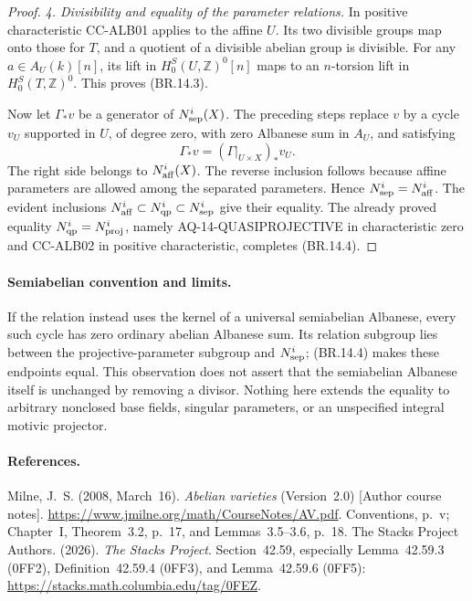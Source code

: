 \begin{proof}
\emph{4. Divisibility and equality of the parameter relations.}
In positive characteristic CC-ALB01 applies to the affine
\(U\).  Its two divisible groups map onto those for \(T\),
and a quotient of a divisible abelian group is divisible.
For any \(a\in A_U(k)[n]\), its lift in
\(H^S_0(U,\mathbb Z)^0[n]\) maps to an \(n\)-torsion lift
in \(H^S_0(T,\mathbb Z)^0\).  This proves (BR.14.3).

Now let \(\Gamma_*v\) be a generator of
\(N^i_{\rm sep}(X)\).  The preceding steps replace \(v\)
by a cycle \(v_U\) supported in \(U\), of degree zero,
with zero Albanese sum in \(A_U\), and satisfying
\[
        \Gamma_*v=(\Gamma|_{U\times X})_*v_U.
                                                               \tag{BR.14.7}
\]
The right side belongs to \(N^i_{\rm aff}(X)\).  The reverse
inclusion follows because affine parameters are allowed among
the separated parameters.  Hence
\(N^i_{\rm sep}=N^i_{\rm aff}\).  The evident inclusions
\(N^i_{\rm aff}\subset N^i_{\rm qp}\subset N^i_{\rm sep}\)
give their equality.  The already proved equality
\(N^i_{\rm qp}=N^i_{\rm proj}\), namely
AQ-14-QUASIPROJECTIVE in characteristic zero and CC-ALB02
in positive characteristic, completes (BR.14.4).
\end{proof}

\paragraph{Semiabelian convention and limits.}
If the relation instead uses the kernel of a universal
semiabelian Albanese, every such cycle has zero ordinary
abelian Albanese sum.  Its relation subgroup lies between
the projective-parameter subgroup and \(N^i_{\rm sep}\);
(BR.14.4) makes these endpoints equal.  This observation
does not assert that the semiabelian Albanese itself is
unchanged by removing a divisor.  Nothing here extends
the equality to arbitrary nonclosed base fields, singular
parameters, or an unspecified integral motivic projector.

\paragraph{References.}
Milne, J.~S. (2008, March~16). \emph{Abelian varieties}
(Version~2.0) [Author course notes].
\url{https://www.jmilne.org/math/CourseNotes/AV.pdf}.
Conventions, p.~v; Chapter~I, Theorem~3.2, p.~17,
and Lemmas~3.5--3.6, p.~18.
The Stacks Project Authors. (2026). \emph{The Stacks Project}.
Section~42.59, especially Lemma~42.59.3 (0FF2),
Definition~42.59.4 (0FF3), and Lemma~42.59.6 (0FF5):
\url{https://stacks.math.columbia.edu/tag/0FEZ}.
